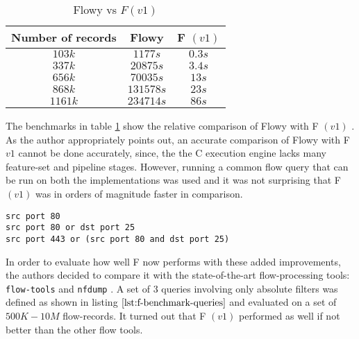 \begin{table}[h!]
	\begin{center}
		\begin{tabular}{|c|c|c|}
		\hline
		Number of records & Flowy & F $(v1)$ \\
		\hline
		\hline
		$103k$ & $1177s$ & $0.3s$\\
		\hline
		$337k$ & $20875s$ & $3.4s$\\
		\hline
		$656k$ & $70035s$ & $13s$\\
		\hline
		$868k$ & $131578s$ & $23s$\\
		\hline
		$1161k$ & $234714s$ & $86s$\\
		\hline
		\end{tabular}
	\end{center}
\caption{Flowy vs $F (v1)$ \cite{jschauer:thesis:2011}}
\label{tab:flowy2-benchmarks}
\end{table}

The benchmarks in table \ref{tab:flowy2-benchmarks} show the relative
comparison of Flowy \cite{kkanev:thesis:2009} with F $(v1)$
\cite{jschauer:thesis:2011}. As the author appropriately points out, an
accurate comparison of Flowy with F $v1$ cannot be done accurately, since, the
the C execution engine  lacks many feature-set and
pipeline stages. However, running a common flow query that can be run on both
the implementations was used and it was not surprising that F $(v1)$ was in
orders of magnitude faster in comparison.

\begin{lstlisting}
src port 80
src port 80 or dst port 25
src port 443 or (src port 80 and dst port 25)
\end{lstlisting}

In order to evaluate how well F now performs with these added improvements,
the authors decided to compare it with the state-of-the-art flow-processing
tools:  \texttt{flow-tools}
\cite{sromig:2000} and \texttt{nfdump} \cite{phaag:2006}. A set of $3$ queries
involving only absolute filters was defined as shown in listing
$\ref{lst:f-benchmark-queries}$ and evaluated on a set of $500K-10M$
flow-records. It turned out that F $(v1)$ performed as well if not better than
the other flow tools.
